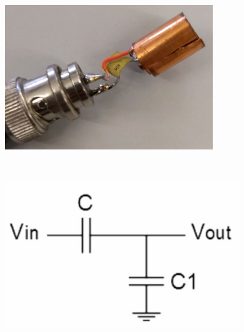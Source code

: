 	\begin{figure}[h!]
		\centering
		\begin{minipage}{.45\textwidth}
			\centering
			\includegraphics[width=0.8\textwidth,keepaspectratio]{figures/5.PreliminaryW/voltage_sensor}
			\label{fig:5.voltage_sensor}
		\end{minipage}%
		\begin{minipage}{.03\textwidth}  ~\end{minipage}	
		\begin{minipage}{.45\textwidth}
			\centering
			\includegraphics[width=0.9\textwidth,keepaspectratio]{figures/5.PreliminaryW/voltage_sensor_eq}
			\label{fig:5.voltage_sensor_eq}
		\end{minipage}
	\end{figure}

